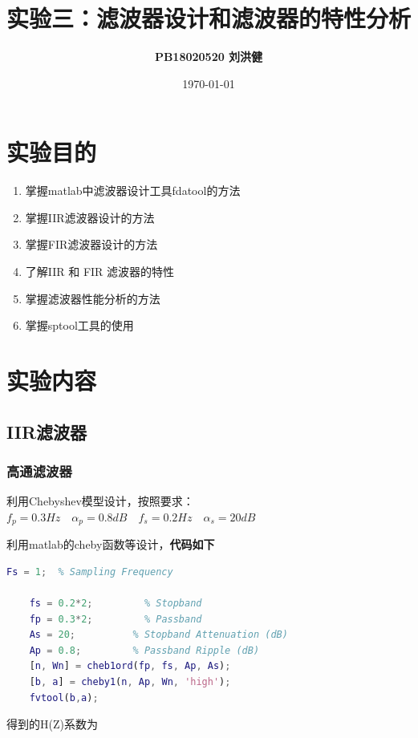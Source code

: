 \documentclass[UTF8]{ctexart}
\title{\huge{实验三：滤波器设计和滤波器的特性分析}}
\author{\textbf{PB18020520 \qquad 刘洪健}}
\date{\today}
\begin{document}
\maketitle
\tableofcontents
\section{实验目的}
\begin{enumerate}
	\item 掌握matlab中滤波器设计工具fdatool的方法
	\item 掌握IIR滤波器设计的方法
	\item 掌握FIR滤波器设计的方法
	\item 了解IIR 和 FIR 滤波器的特性
	\item 掌握滤波器性能分析的方法
	\item 掌握sptool工具的使用
\end{enumerate}
\section{实验内容}
\subsection{IIR滤波器}
\subsubsection{高通滤波器}
\hspace*{2em}利用Chebyshev模型设计，按照要求：$f_p=0.3Hz \quad {\alpha}_p=0.8dB \quad f_s=0.2Hz \quad {\alpha}_s=20dB$

利用matlab的cheby函数等设计，\textbf{代码如下}
\begin{lstlisting}[language=matlab]
	Fs = 1;  % Sampling Frequency

	fs = 0.2*2;         % Stopband 
	fp = 0.3*2;         % Passband 
	As = 20;          % Stopband Attenuation (dB)
	Ap = 0.8;         % Passband Ripple (dB)
	[n, Wn] = cheb1ord(fp, fs, Ap, As);
	[b, a] = cheby1(n, Ap, Wn, 'high');
	fvtool(b,a);
\end{lstlisting}
得到的H(Z)系数为
\end{document}
